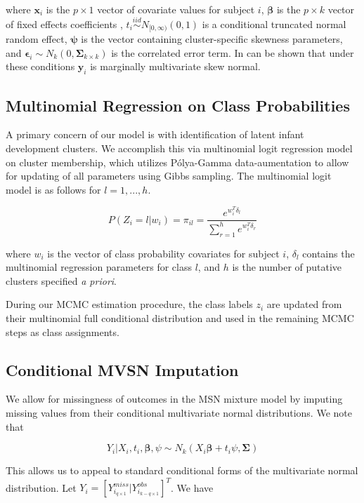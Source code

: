 \documentclass[useAMS,referee]{biom}
\begin{document}
where $\mathbf{x}_i$ is the $p \times 1$ vector of covariate values for subject $i$, $\boldsymbol\beta$ is the $p \times k$ vector of fixed effects coefficients , $t_i \stackrel{iid}{\sim} N_{[0,\infty)}(0,1)$ is a conditional truncated normal random effect, $\boldsymbol\psi$ is the vector containing cluster-specific skewness parameters, and $\boldsymbol\epsilon_i \sim N_k(0,\boldsymbol\Sigma_{k \times k})$ is the correlated error term. In can be shown that under these conditions $\mathbf{y}_i$ is marginally multivariate skew normal.  

\subsection{Multinomial Regression on Class Probabilities}

A primary concern of our model is with identification of latent infant development clusters. We accomplish this via multinomial logit regression model on cluster membership, which utilizes P\'{o}lya-Gamma data-aumentation to allow for updating of all parameters using Gibbs sampling. The multinomial logit model is as follows for $l = 1,...,h$.

$$P(Z_i = l|w_i) = \pi_{il} = \frac{e^{w_i^T \delta_l}}{\sum_{r = 1}^h e^{w_i^T \delta_r}}$$

where $w_i$ is the vector of class probability covariates for subject $i$, $\delta_l$ contains the multinomial regression parameters for class $l$, and $h$ is the number of putative clusters specified \textit{a priori}.

During our MCMC estimation procedure, the class labels $z_i$ are updated from their multinomial full conditional distribution and used in the remaining MCMC steps as class assignments.

\subsection{Conditional MVSN Imputation}

We allow for missingness of outcomes in the MSN mixture model by imputing missing values from their conditional multivariate normal distributions. We note that

$$Y_i|X_i,t_i,\boldsymbol\beta,\psi \sim N_k(X_i \boldsymbol\beta + t_i \psi, \boldsymbol\Sigma)$$

This allows us to appeal to standard conditional forms of the multivariate normal distribution. Let $Y_i = [Y^{miss}_{i_{q \times 1}} | Y^{obs}_{i_{k - q \times 1}}]^T$. We have
\end{document}
